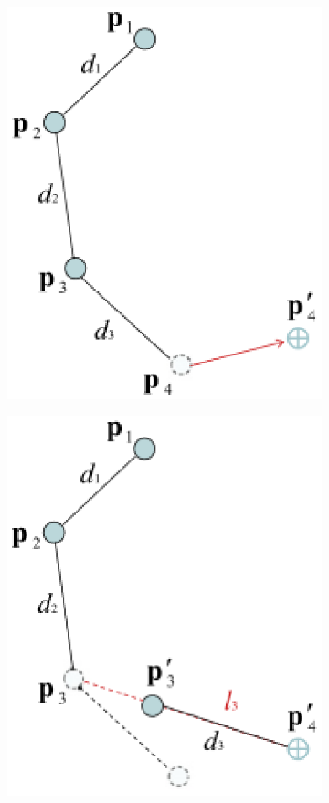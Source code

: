 \begin{figure}
\begin{subfigure}{0.2\textwidth}
        \includegraphics[width=\linewidth]{grafika/fabrik_iteration2.eps}
        \subcaption{}
        \label{fig:fabrik2}
    \end{subfigure}
    \begin{subfigure}{0.2\textwidth}
        \centering
        \includegraphics[width=\linewidth]{grafika/fabrik_iteration3.eps}

\end{subfigure}
\end{figure}
